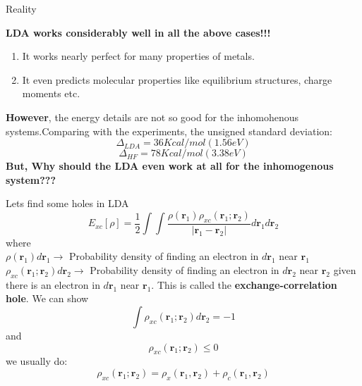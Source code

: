 \documentclass{beamer}
\begin{document}
	\begin{frame}[t]{Reality}
	 \begin{large}
	  \textbf{LDA works considerably well in all the above cases!!!}
	 \end{large}
	 \begin{enumerate}
	   \item{It works nearly perfect for many properties of metals.}
	   \item{It even predicts molecular properties like equilibrium structures, charge moments etc.}
	   \linebreak
	  \end{enumerate}
	  \textbf{However}, the energy details are not so good for the inhomohenous systems.Comparing with the experiments, the unsigned standard deviation:
	  \begin{equation}\label{eq:3}
	  	\Delta_{LDA} = 36 Kcal/mol (1.56 eV)
	  \end{equation}
	  \begin{equation}	\label{eq:4}   
	  	\Delta_{HF} = 78 Kcal/mol (3.38 eV)
	  \end{equation}
	  \large{\textbf{But, Why should the LDA even work at all for the inhomogenous system???}}
	\end{frame}
	
	\begin{frame}[t]{Lets find some holes in LDA}
	 \begin{equation}\label{eq:5}
	 E_{xc}[\rho] = \frac{1}{2}\displaystyle{\int}\displaystyle{\int} \frac{\rho(\textbf{r}_1)\rho_{xc}(\textbf{r}_1;\textbf{r}_2)}{|\textbf{r}_1-\textbf{r}_2|}d\textbf{r}_1 d\textbf{r}_2
	 \end{equation}
	 where\\
	 $\rho(\textbf{r}_1) d\textbf{r}_1 \rightarrow$ Probability density of finding an electron in $d\textbf{r}_1$ near $\textbf{r}_1$\\
	 $\rho_{xc}(\textbf{r}_1;\textbf{r}_2) d\textbf{r}_2 \rightarrow$ Probability density of finding an electron in $d\textbf{r}_2$ near $\textbf{r}_2$ given there is an electron in $d\textbf{r}_1$ near $\textbf{r}_1$. This is called the \textbf{exchange-correlation hole}. We can show\\
	\begin{equation}\label{eq:6}
	 \displaystyle{\int} \rho_{xc}(\textbf{r}_1;\textbf{r}_2) d\textbf{r}_2 = -1
	\end{equation}
	and
	\begin{equation}\label{eq:7}
	\rho_{xc}(\textbf{r}_1;\textbf{r}_2) \leqslant 0
	\end{equation}
	we usually do:
	\begin{equation}\label{eq:8}
	\rho_{xc}(\textbf{r}_1;\textbf{r}_2) = \rho_{x}(\textbf{r}_1,\textbf{r}_2) + \rho_{c}(\textbf{r}_1,\textbf{r}_2)
	\end{equation}
	\end{frame}	
	
\end{document}
